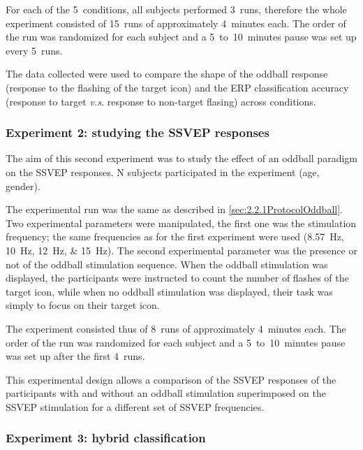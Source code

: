 \documentclass[10pt]{article}
\begin{document}
        For each of the 5~conditions, all subjects performed 3~runs, therefore the whole experiment consisted of 15~runs of approximately 4~minutes each.
        The order of the run was randomized for each subject and a 5~to~10~minutes pause was set up every 5~runs.

        The data collected were used to compare the shape of the oddball response (response to the flashing of the target icon) and the \ac{ERP} classification accuracy (response to target \emph{v.s.} response to non-target flasing) across conditions.

        \subsubsection{Experiment 2: studying the \acs{SSVEP} responses}
        \label{sec:2.2.2ProtocolSSVEP}

        The aim of this second experiment was to study the effect of an oddball paradigm on the \ac{SSVEP} responses.
        N subjects participated in the experiment (age, gender).

        The experimental run was the same as described in \autoref{sec:2.2.1ProtocolOddball}.
        Two experimental parameters were manipulated, the first one was the stimulation frequency; the same frequencies as for the first experiment were used (\SIlist[list-units = single]{8.57;10;12;15}{\Hz}).
        The second experimental parameter was the presence or not of the oddball stimulation sequence.
        When the oddball stimulation was displayed, the participants were instructed to count the number of flashes of the target icon, while when no oddball stimulation was displayed, their task was simply to focus on their target icon.

        The experiment consisted thus of 8~runs of approximately 4~minutes each.
        The order of the run was randomized for each subject and a 5~to~10~minutes pause was set up after the first 4~runs.

        This experimental design allows a comparison of the \ac{SSVEP} responses of the participants with and without an oddball stimulation superimposed on the \ac{SSVEP} stimulation for a different set of \ac{SSVEP} frequencies.

        \subsubsection{Experiment 3: hybrid classification}
        \label{sec:2.2.3ProtocolHybrid}
\end{document}
